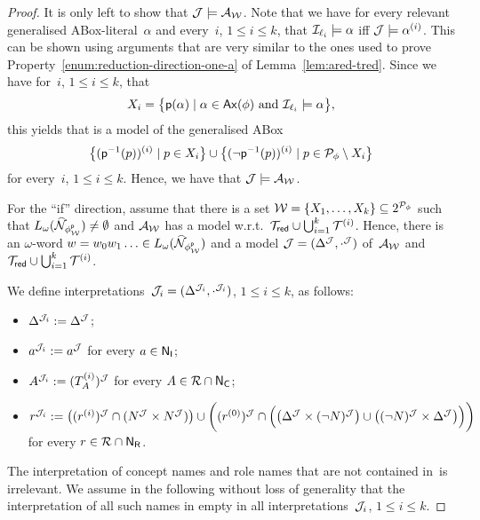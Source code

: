 \begin{proof}
    It is only left to show that $\mathcal{J}\models\mathcal{A}_\mathcal{W}$.  Note that we have for
    every relevant generalised ABox-literal~$\alpha$ and every~$i$, $1\le i\le
    k$, that $\mathcal{I}_{\ell_i}\models\alpha$ iff $\mathcal{J}\models\alpha^{(i)}$.  This
    can be shown using arguments that are very similar to the ones used to prove
    Property~\eqref{enum:reduction-direction-one-a} of
    Lemma~\ref{lem:ared-tred}.  Since we have for~$i$, $1\le i\le k$, that
    \[X_i=\bigl\{\mathsf{p}(\alpha)\mid\alpha\in\operatorname{\mathsf{Ax}}(\phi)\ \text{and}\
        \mathcal{I}_{\ell_i}\models\alpha\bigr\},\]
    this yields that \Jmc is a model of the generalised ABox
    \[\bigl\{(\psf^{-1}(p))^{(i)}\mid p\in X_i\bigr\}\cup%
        \bigl\{(\lnot\psf^{-1}(p))^{(i)}\mid p\in\Pmc_\phi\setminus X_i\bigr\}\]
    for every~$i$, $1\le i\le k$.  Hence, we have that $\mathcal{J}\models\mathcal{A}_\mathcal{W}$.

    For the \enquote{if} direction, assume that there is a set
    $\mathcal{W}=\{X_1,\dots,X_k\}\subseteq 2^{\mathcal{P}_\phi}$ such that
    $L_\omega(\smash{\widehat{\mathcal{N}}_{\phi^\mathsf{p}_\mathcal{W}}})\ne\emptyset$ and
    $\mathcal{A}_\mathcal{W}$ has a model w.r.t.\ $\mathcal{T}_\mathsf{red}\cup\bigcup_{i=1}^k\mathcal{T}^{(i)}$.
    Hence, there is an $\omega$-word
    $w=w_0w_1\dotso\in L_\omega(\smash{\widehat{\mathcal{N}}_{\phi^\mathsf{p}_\mathcal{W}}})$ and a
    model $\mathcal{J}=(\Delta^\mathcal{J},\cdot^\mathcal{J})$ of~$\mathcal{A}_\mathcal{W}$ and
    $\mathcal{T}_\mathsf{red}\cup\bigcup_{i=1}^k\mathcal{T}^{(i)}$.

    We define interpretations~$\mathcal{J}_i=(\Delta^{\mathcal{J}_i},\cdot^{\mathcal{J}_i})$,
    $1\le i\le k$, as follows:
    \begin{itemize}
        \item $\Delta^{\mathcal{J}_i}:=\Delta^\mathcal{J}$;
        \item $a^{\mathcal{J}_i}:=a^\mathcal{J}$ for every $a\in\mathsf{N_I}$;
        \item $A^{\mathcal{J}_i}:=(T_A^{(i)})^\mathcal{J}$ for every $A\in\mathcal{R}\cap\mathsf{N_C}$;
        \item $r^{\Jmc_i}:=\bigl((r^{(i)})^\Jmc\cap(N^\Jmc\times N^\Jmc)\bigr)\cup%
                \biggl((r^{(0)})^\Jmc\cap\Bigl(\bigl(\Delta^\Jmc\times(\lnot N)^\Jmc\bigr)\cup%
                \bigl((\lnot N)^\Jmc\times\Delta^\Jmc\bigr)\Bigr)\biggr)$
            for every $r\in\mathcal{R}\cap\mathsf{N_R}$.
    \end{itemize}
    The interpretation of concept names and role names that are not contained
    in~\Rmc is irrelevant.  We assume in the following without loss of
    generality that the interpretation of all such names in empty in all
    interpretations~$\mathcal{J}_i$, $1\le i\le k$.


\end{proof}
